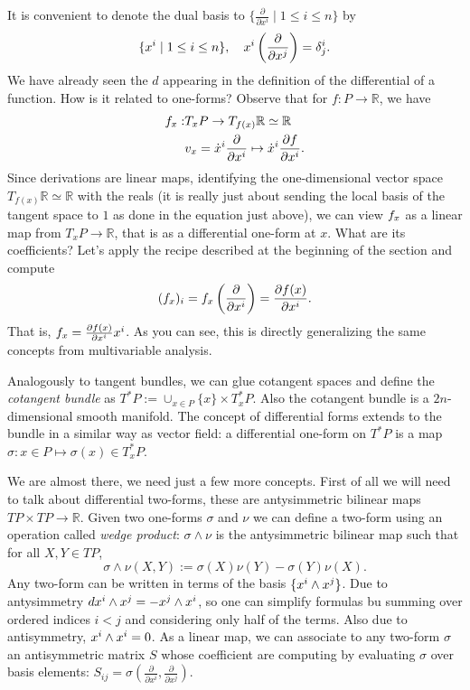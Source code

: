 \documentclass[english,fontsize=11pt,paper=a5,oneside]{scrbook}
\newcommand{\R}{\mathbb{R}}
\let\d\relax
\newcommand{\d}{\mathrm{d}}
\theoremstyle{definition}
\begin{document}
It is convenient to denote the dual basis to $\{\frac{\partial}{\partial x^i} \mid 1\leq i \leq n\}$ by
\begin{equation}
  \{ \d x^i \mid 1 \leq i \leq n \}, \quad \d x^i\left(\frac{\partial}{\partial x^j}\right) = \delta_j^i.
\end{equation}
We have already seen the $d$ appearing in the definition of the differential of a function.
How is it related to one-forms?
Observe that for $f : P \to \R$, we have
\begin{align}
  \d f_x : & T_x P \to T_{f(x)} \R \simeq \R \\
         & v_x = \dot x^i \frac{\partial}{\partial x^i} \mapsto \dot x^i \frac{\partial f}{\partial x^i}.
\end{align}
Since derivations are linear maps, identifying the one-dimensional vector space $T_{f(x)}\R \simeq \R$ with the reals (it is really just about sending the local basis of the tangent space to $1$ as done in the equation just above), we can view $\d f_x$ as a linear map from $T_x P \to \R$, that is as a differential one-form at $x$.
What are its coefficients? Let's apply the recipe described at the beginning of the section and compute
\begin{equation}
  (\d f_x)_i = \d f_x\left(\frac{\partial}{\partial x^i}\right) = \frac{\partial f(x)}{\partial x^i}.
\end{equation}
That is, $\d f_x = \frac{\partial f(x)}{\partial x^i} \d x^i$.
As you can see, this is directly generalizing the same concepts from multivariable analysis.

Analogously to tangent bundles, we can glue cotangent spaces and define the \emph{cotangent bundle} as $T^*P := \cup_{x\in P} \{x\}\times T^*_x P$. Also the cotangent bundle is a $2n$-dimensional smooth manifold.
The concept of differential forms extends to the bundle in a similar way as vector field: a differential one-form on $T^*P$ is a map $\sigma : x\in P \mapsto \sigma(x) \in T^*_x P$.

We are almost there, we need just a few more concepts.
First of all we will need to talk about differential two-forms, these are antysimmetric bilinear maps $TP \times TP \to \R$.
Given two one-forms $\sigma$ and $\nu$ we can define a two-form using an operation called \emph{wedge product}: $\sigma\wedge\nu$ is the antysimmetric bilinear map such that for all $X,Y \in TP$,
\begin{equation}
  \sigma\wedge\nu(X,Y) := \sigma(X)\nu(Y) - \sigma(Y)\nu(X).
\end{equation}
Any two-form can be written in terms of the basis $\{\d x^i\wedge \d x^j\}$. Due to antysimmetry $dx^i \wedge \d x^j = - \d x^j \wedge \d x^i$, so one can simplify formulas bu summing over ordered indices $i<j$ and considering only half of the terms. Also due to antisymmetry, $\d x^i \wedge \d x^i = 0$. As a linear map, we can associate to any two-form $\sigma$ an antisymmetric matrix $S$ whose coefficient are computing by evaluating $\sigma$ over basis elements: $S_{ij} = \sigma\left(\frac{\partial}{\partial x^i}, \frac{\partial}{\partial x^j}\right)$.
\end{document}
